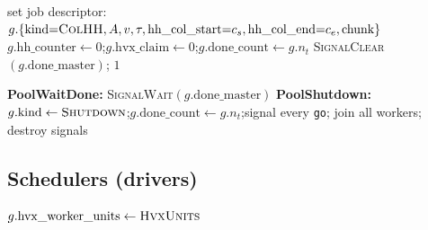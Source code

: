 \documentclass[11pt]{article}
\newcommand{\code}[1]{\texttt{\small #1}}
\begin{document}
\begin{algorithm}[H]
\caption{\textsc{PoolDispatchNonblocking}$(A, v, \tau, c_s, c_e, \mathrm{chunk}) \to \mathrm{dispatched}$}
\lForEach{$j \in [c_s, c_e)$}{$g.\mathrm{col\_done}[j] \gets 0$}
set job descriptor: $g.\{\mathrm{kind}{=}\textsc{ColHH}, A, v, \tau, \mathrm{hh\_col\_start}{=}c_s, \mathrm{hh\_col\_end}{=}c_e, \mathrm{chunk}\}$\;
$g.\mathrm{hh\_counter} \gets 0$;\quad $g.\mathrm{hvx\_claim} \gets 0$;\quad $g.\mathrm{done\_count} \gets g.n_t$\;
\textsc{SignalClear}$(g.\mathrm{done\_master})$;\quad \lForEach{$t \in [0,n_t)$}{\textsc{SignalSet}$(g.\mathrm{go}[t])$}
\Return $1$ 
\end{algorithm}

\begin{algorithm}[H]
\caption{\textsc{PoolWaitDone}$()$ and \textsc{PoolShutdown}$()$}
\textbf{PoolWaitDone:} \textsc{SignalWait}$(g.\mathrm{done\_master})$\;
\smallskip
\textbf{PoolShutdown:} $g.\mathrm{kind} \gets \textsc{Shutdown}$;\quad $g.\mathrm{done\_count} \gets g.n_t$;\quad signal every \code{go}; join all workers; destroy signals\;
\end{algorithm}

\subsection{Schedulers (drivers)}

\begin{algorithm}[H]
\caption{\textsc{QrDagBarrier}$(A)$ --- reference schedule (no overlap)}
$g.\mathrm{hvx\_worker\_units} \gets \textsc{HvxUnits}$ 
\end{algorithm}
\end{document}
